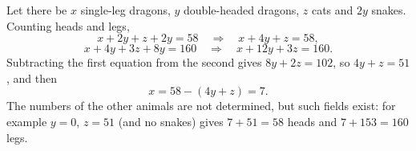 Let there be $x$ single-leg dragons, $y$ double-headed dragons, $z$ cats and $2y$ snakes. Counting heads and legs,
\[
x+2y+z+2y=58\quad\Longrightarrow\quad x+4y+z=58,
\]
\[
x+4y+3z+8y=160\quad\Longrightarrow\quad x+12y+3z=160 .
\]
Subtracting the first equation from the second gives $8y+2z=102$, so $4y+z=51$, and then
\[
x=58-(4y+z)=\boxed{7}.
\]
The numbers of the other animals are not determined, but such fields exist: for example $y=0$, $z=51$ (and no snakes) gives $7+51=58$ heads and $7+153=160$ legs.
